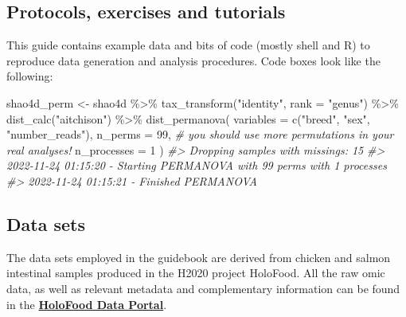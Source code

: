 \documentclass[
]{book}
\newenvironment{Shaded}{\begin{snugshade}}{\end{snugshade}}
\newcommand{\AttributeTok}[1]{\textcolor[rgb]{0.77,0.63,0.00}{#1}}
\newcommand{\CommentTok}[1]{\textcolor[rgb]{0.56,0.35,0.01}{\textit{#1}}}
\newcommand{\DecValTok}[1]{\textcolor[rgb]{0.00,0.00,0.81}{#1}}
\newcommand{\FunctionTok}[1]{\textcolor[rgb]{0.00,0.00,0.00}{#1}}
\newcommand{\NormalTok}[1]{#1}
\newcommand{\OtherTok}[1]{\textcolor[rgb]{0.56,0.35,0.01}{#1}}
\newcommand{\SpecialCharTok}[1]{\textcolor[rgb]{0.00,0.00,0.00}{#1}}
\newcommand{\StringTok}[1]{\textcolor[rgb]{0.31,0.60,0.02}{#1}}
\begin{document}
\hypertarget{protocols-exercises-tutorials}{%
\subsection*{Protocols, exercises and tutorials}\label{protocols-exercises-tutorials}}

This guide contains example data and bits of code (mostly shell and R) to reproduce data generation and analysis procedures. Code boxes look like the following:

\small

\begin{Shaded}
\begin{Highlighting}[]
\NormalTok{shao4d\_perm }\OtherTok{\textless{}{-}}\NormalTok{ shao4d }\SpecialCharTok{\%\textgreater{}\%}
  \FunctionTok{tax\_transform}\NormalTok{(}\StringTok{"identity"}\NormalTok{, }\AttributeTok{rank =} \StringTok{"genus"}\NormalTok{) }\SpecialCharTok{\%\textgreater{}\%}
  \FunctionTok{dist\_calc}\NormalTok{(}\StringTok{"aitchison"}\NormalTok{) }\SpecialCharTok{\%\textgreater{}\%}
  \FunctionTok{dist\_permanova}\NormalTok{(}
    \AttributeTok{variables =} \FunctionTok{c}\NormalTok{(}\StringTok{"breed"}\NormalTok{, }\StringTok{"sex"}\NormalTok{, }\StringTok{"number\_reads"}\NormalTok{),}
    \AttributeTok{n\_perms =} \DecValTok{99}\NormalTok{, }\CommentTok{\# you should use more permutations in your real analyses!}
    \AttributeTok{n\_processes =} \DecValTok{1}
\NormalTok{  )}
\CommentTok{\#\textgreater{} Dropping samples with missings: 15}
\CommentTok{\#\textgreater{} 2022{-}11{-}24 01:15:20 {-} Starting PERMANOVA with 99 perms with 1 processes}
\CommentTok{\#\textgreater{} 2022{-}11{-}24 01:15:21 {-} Finished PERMANOVA}
\end{Highlighting}
\end{Shaded}

\normalsize

\hypertarget{datasets}{%
\subsection*{Data sets}\label{datasets}}

The data sets employed in the guidebook are derived from chicken and salmon intestinal samples produced in the H2020 project HoloFood. All the raw omic data, as well as relevant metadata and complementary information can be found in the \textbf{\href{https://www.holofooddata.org}{HoloFood Data Portal}}.
\end{document}
